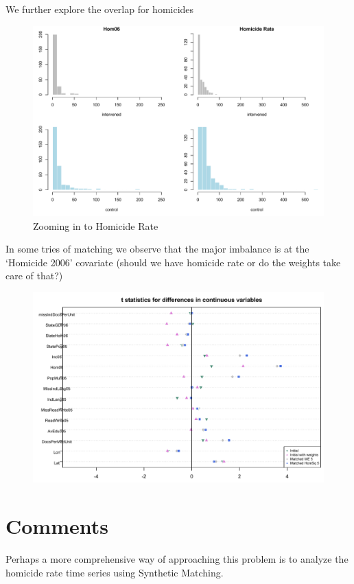 \documentclass{article}[11 pt]
\begin{document}
We further explore the overlap for homicides
\begin{figure}[ht]

    \centering
        \includegraphics[scale=0.6]{ZoomHom.pdf}
\caption{Zooming in to Homicide Rate}
\label{ZoomHom}
\end{figure}

In some tries of matching we observe that the major imbalance is at the `Homicide 2006' covariate (should we have homicide rate or do the weights take care of that?)



\begin{figure}[ht]
    \centering
        \includegraphics[scale=0.5]{MEloveplot.pdf}
\end{figure}

\section{Comments}
Perhaps a more comprehensive way of approaching this problem is to analyze the homicide rate time series using Synthetic Matching.

	
\end{document}
